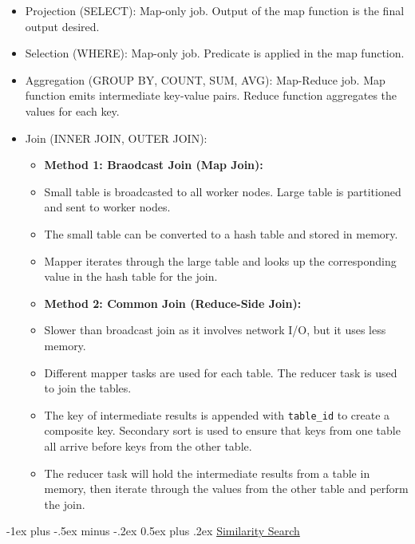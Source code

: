 \documentclass[10pt, landscape]{article}
\makeatletter
\renewcommand{\section}{\@startsection{section}{1}{0mm}%
  {-1ex plus -.5ex minus -.2ex}%
  {0.5ex plus .2ex}%
{\normalfont\large\bfseries}}
\makeatother
\begin{document}
\begin{multicols*}{4}
  \begin{itemize}
    \item Projection (SELECT): Map-only job. Output of the map function is the final output desired.
    \item Selection (WHERE): Map-only job. Predicate is applied in the map function.
    \item Aggregation (GROUP BY, COUNT, SUM, AVG): Map-Reduce job. Map function emits intermediate key-value pairs. Reduce function aggregates the values for each key.
    \item Join (INNER JOIN, OUTER JOIN):
      \begin{itemize}
        \item \textbf{Method 1: Braodcast Join (Map Join):}
        \item Small table is broadcasted to all worker nodes. Large table is partitioned and sent to worker nodes.
        \item The small table can be converted to a hash table and stored in memory.
        \item Mapper iterates through the large table and looks up the corresponding value in the hash table for the join.
        \item \textbf{Method 2: Common Join (Reduce-Side Join):}
        \item Slower than broadcast join as it involves network I/O, but it uses less memory.
        \item Different mapper tasks are used for each table. The reducer task is used to join the tables.
        \item The key of intermediate results is appended with \texttt{table\_id} to create a composite key. Secondary sort is used to ensure that keys from one table all arrive before keys from the other table.
        \item The reducer task will hold the intermediate results from a table in memory, then iterate through the values from the other table and perform the join.
      \end{itemize}
  \end{itemize}

  \section{\underline{Similarity Search}}


\end{multicols*}
\end{document}
